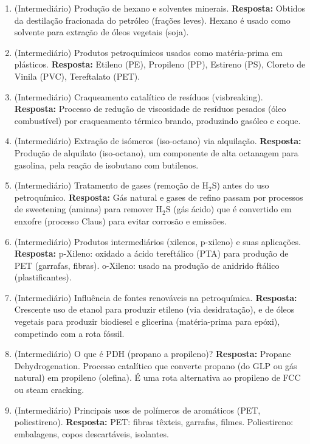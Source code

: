\documentclass[11pt,a4paper]{article}
\begin{document}
\begin{enumerate}
  \item (Intermediário) Produção de hexano e solventes minerais.
  \textbf{Resposta:} Obtidos da destilação fracionada do petróleo (frações leves). Hexano é usado como solvente para extração de óleos vegetais (soja).

  \item (Intermediário) Produtos petroquímicos usados como matéria-prima em plásticos.
  \textbf{Resposta:} Etileno (PE), Propileno (PP), Estireno (PS), Cloreto de Vinila (PVC), Tereftalato (PET).

  \item (Intermediário) Craqueamento catalítico de resíduos (visbreaking).
  \textbf{Resposta:} Processo de redução de viscosidade de resíduos pesados (óleo combustível) por craqueamento térmico brando, produzindo gasóleo e coque.

  \item (Intermediário) Extração de isómeros (iso-octano) via alquilação.
  \textbf{Resposta:} Produção de alquilato (iso-octano), um componente de alta octanagem para gasolina, pela reação de isobutano com butilenos.

  \item (Intermediário) Tratamento de gases (remoção de H$_2$S) antes do uso petroquímico.
  \textbf{Resposta:} Gás natural e gases de refino passam por processos de sweetening (aminas) para remover H$_2$S (gás ácido) que é convertido em enxofre (processo Claus) para evitar corrosão e emissões.

  \item (Intermediário) Produtos intermediários (xilenos, p-xileno) e suas aplicações.
  \textbf{Resposta:} p-Xileno: oxidado a ácido tereftálico (PTA) para produção de PET (garrafas, fibras). o-Xileno: usado na produção de anidrido ftálico (plastificantes).

  \item (Intermediário) Influência de fontes renováveis na petroquímica.
  \textbf{Resposta:} Crescente uso de etanol para produzir etileno (via desidratação), e de óleos vegetais para produzir biodiesel e glicerina (matéria-prima para epóxi), competindo com a rota fóssil.

  \item (Intermediário) O que é PDH (propano a propileno)?
  \textbf{Resposta:} Propane Dehydrogenation. Processo catalítico que converte propano (do GLP ou gás natural) em propileno (olefina). É uma rota alternativa ao propileno de FCC ou steam cracking.

  \item (Intermediário) Principais usos de polímeros de aromáticos (PET, poliestireno).
  \textbf{Resposta:} PET: fibras têxteis, garrafas, filmes. Poliestireno: embalagens, copos descartáveis, isolantes.


\end{enumerate}
\end{document}
